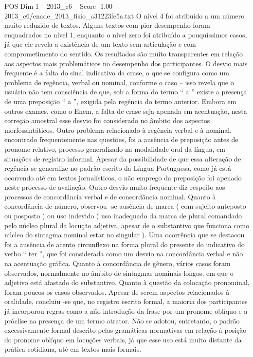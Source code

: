 \begin{textsample}{POS Dim 1 – 2013\_c6 – Score -1.00 – 2013\_c6/enade\_2013\_fisio\_a31223fe5a.txt}
O nível 4 foi atribuído a um número muito reduzido de textos.
Alguns textos com pior desempenho foram enquadrados no nível 1, enquanto o nível zero foi atribuído a pouquíssimos casos, já que ele revela a existência de um texto sem articulação e com comprometimento do sentido.
Os resultados são muito transparentes em relação aos aspectos mais problemáticos no desempenho dos participantes.
O desvio mais frequente é a falta do sinal indicativo da crase, o que se configura como um problema de regência, verbal ou nominal, conforme o caso – isso revela que o usuário não tem consciência de que, sob a forma do termo “ a ” existe a presença de uma preposição “ a ”, exigida pela regência do termo anterior.
Embora em outros exames, como o Enem, a falta de crase seja apenada em acentuação, nesta correção amostral esse desvio foi considerado no âmbito dos aspectos morfossintáticos.
Outro problema relacionado à regência verbal e à nominal, encontrado frequentemente nas questões, foi a ausência de preposição antes de pronome relativo, processo generalizado na modalidade oral da língua, em situações de registro informal.
Apesar da possibilidade de que essa alteração de regência se generalize no padrão escrito da Língua Portuguesa, como já está ocorrendo até em textos jornalísticos, o não emprego da preposição foi apenado neste processo de avaliação.
Outro desvio muito frequente diz respeito aos processos de concordância verbal e de concordância nominal.
Quanto à concordância de número, observou -se ausência de marca ( com sujeito anteposto ou posposto ) ou uso indevido ( uso inadequado da marca de plural comandado pelo núcleo plural da locução adjetiva, apesar de o substantivo que funciona como núcleo do sintagma nominal estar no singular ).
Uma ocorrência que se destacou foi a ausência de acento circunflexo na forma plural do presente do indicativo do verbo “ ter ”, que foi considerada como um desvio na concordância verbal e não na acentuação gráfica.
Quanto à concordância de gênero, vários casos foram observados, normalmente no âmbito de sintagmas nominais longos, em que o adjetivo está afastado do substantivo.
Quanto à questão da colocação pronominal, foram poucos os casos observados.
Apesar de serem aspectos relacionados à oralidade, concluiu -se que, no registro escrito formal, a maioria dos participantes já incorporou regras como a não introdução da frase por um pronome oblíquo e a próclise na presença de um termo atrator.
Não se adotou, entretanto, o padrão excessivamente formal descrito pelas gramáticas normativas em relação à posição do pronome oblíquo em locuções verbais, já que esse uso está muito distante da prática cotidiana, até em textos mais formais.

\end{textsample}
